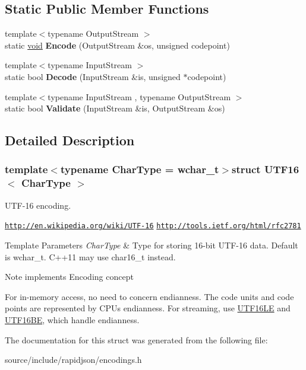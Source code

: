 \subsection*{Static Public Member Functions}
\begin{DoxyCompactItemize}
\item 
\hypertarget{struct_u_t_f16_a9d8ded01244e30d037c4afa10ee2b30e}{}{\footnotesize template$<$typename Output\+Stream $>$ }\\static \hyperlink{_s_d_l__audio_8h_a52835ae37c4bb905b903cbaf5d04b05f}{void} {\bfseries Encode} (Output\+Stream \&os, unsigned codepoint)\label{struct_u_t_f16_a9d8ded01244e30d037c4afa10ee2b30e}

\item 
\hypertarget{struct_u_t_f16_a124c79dfd9f9b4c3fb65bd55ba17b4be}{}{\footnotesize template$<$typename Input\+Stream $>$ }\\static bool {\bfseries Decode} (Input\+Stream \&is, unsigned $\ast$codepoint)\label{struct_u_t_f16_a124c79dfd9f9b4c3fb65bd55ba17b4be}

\item 
\hypertarget{struct_u_t_f16_a7516184ed5dce10c0e7895bec124d97d}{}{\footnotesize template$<$typename Input\+Stream , typename Output\+Stream $>$ }\\static bool {\bfseries Validate} (Input\+Stream \&is, Output\+Stream \&os)\label{struct_u_t_f16_a7516184ed5dce10c0e7895bec124d97d}

\end{DoxyCompactItemize}


\subsection{Detailed Description}
\subsubsection*{template$<$typename Char\+Type = wchar\+\_\+t$>$struct U\+T\+F16$<$ Char\+Type $>$}

U\+T\+F-\/16 encoding. 

\href{http://en.wikipedia.org/wiki/UTF-16}{\tt http\+://en.\+wikipedia.\+org/wiki/\+U\+T\+F-\/16} \href{http://tools.ietf.org/html/rfc2781}{\tt http\+://tools.\+ietf.\+org/html/rfc2781} 
\begin{DoxyTemplParams}{Template Parameters}
{\em Char\+Type} & Type for storing 16-\/bit U\+T\+F-\/16 data. Default is wchar\+\_\+t. C++11 may use char16\+\_\+t instead. \\
\hline
\end{DoxyTemplParams}
\begin{DoxyNote}{Note}
implements Encoding concept

For in-\/memory access, no need to concern endianness. The code units and code points are represented by C\+P\+U\textquotesingle{}s endianness. For streaming, use \hyperlink{struct_u_t_f16_l_e}{U\+T\+F16\+L\+E} and \hyperlink{struct_u_t_f16_b_e}{U\+T\+F16\+B\+E}, which handle endianness. 
\end{DoxyNote}


The documentation for this struct was generated from the following file\+:\begin{DoxyCompactItemize}
\item 
source/include/rapidjson/encodings.\+h\end{DoxyCompactItemize}
